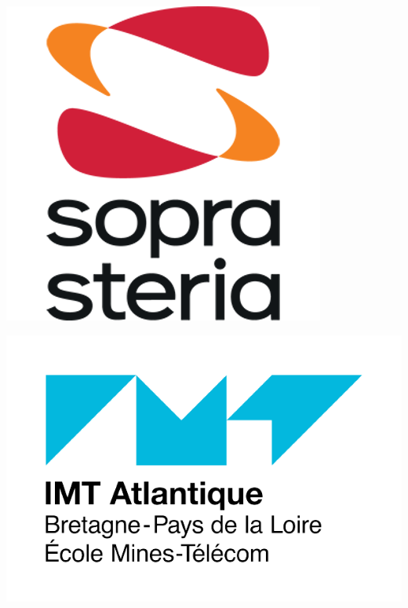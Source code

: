 \begin{titlepage}
  \newcommand{\HRule}{\rule{\linewidth}{0.5mm}} %
  \center %
  \begin{minipage}{0.32\textwidth}
      \centering
      \includegraphics[scale=0.22]{figures/soprasteria.png}
  \end{minipage}
  \hfill
  \begin{minipage}{0.32\textwidth}
      \centering
      \includegraphics[scale=0.2]{figures/IMTA.png}

\end{minipage}
\end{titlepage}
